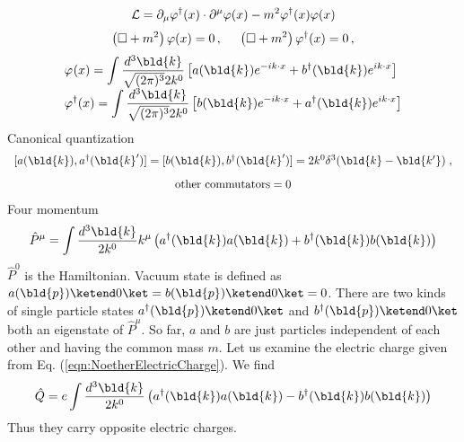 \begin{equation}
{\cal L} = \partial_\mu \varphi^\dagger(x)\cdot \partial^\mu \varphi(x)
- m^2 \varphi^\dagger(x)\varphi(x)
\label{eqn:cmplscLagdens}
\end{equation}
\begin{equation}
\left( \Box + m^2 \right) \varphi(x) = 0\,,
\hspace{5mm}
\left( \Box + m^2 \right) \varphi^\dagger(x) = 0\,,
\end{equation}
\begin{equation}
\begin{array}{l}
\displaystyle
\varphi_{}(x) = \int \frac{d^3 \bld{k}}{\sqrt{(2\pi)^3}2k^0} \left[
a(\bld{k}) e^{-i k \cdot x} + b^\dagger(\bld{k})e^{i k \cdot x} \right]
\\
\displaystyle
\varphi^\dagger_{}(x) = \int \frac{d^3 \bld{k}}{\sqrt{(2\pi)^3}2k^0} \left[
b(\bld{k})e^{- i k \cdot x}  + a^\dagger (\bld{k}) e^{i k \cdot x} \right]
\end{array}
\label{eqn:CompScFourier}
\end{equation}
Canonical quantization
\begin{equation}
\begin{array}{c}
[ a(\bld{k}), a^\dagger(\bld{k}')] = 
[ b(\bld{k}), b^\dagger(\bld{k}')] = 
2k^0\delta^3 (\bld{k} - \bld{k'} )\;,
\vspace{3mm}
\\
\mbox{other commutators} = 0
\label{eqn:complscalarcancomm}
\end{array}
\end{equation}
Four momentum
\begin{equation}
\hat{P}^\mu = \int \frac{d^3 \bld{k}}{2k^0} k^\mu \left(
a^\dagger(\bld{k}) a(\bld{k}) + b^\dagger(\bld{k}) b(\bld{k})
\right)
\label{eqn:KGcomplex_FourMomentum}
\end{equation}
$\hat{P}^0$ is the Hamiltonian.
Vacuum state is defined as $a(\bld{p}) \ketend 0 \ket = b(\bld{p}) \ketend 0 \ket =0$.
There are two kinds of single particle states $a^\dagger(\bld{p}) \ketend 0 \ket$ and
$b^\dagger(\bld{p}) \ketend 0 \ket$ both an eigenstate of $\hat{P}^\mu$.
So far, $a$ and $b$ are just particles independent of each other and having
the common mass $m$. Let us examine the electric charge given from
Eq. (\ref{eqn:NoetherElectricCharge}). We find
\begin{equation}
\hat{Q} = e \int \frac{d^3 \bld{k}}{2k^0}  \left(
a^\dagger(\bld{k}) a(\bld{k}) - b^\dagger(\bld{k}) b(\bld{k})
\right)
\label{eqn:KGcomplex_Charge}
\end{equation}
Thus they carry opposite electric charges.

